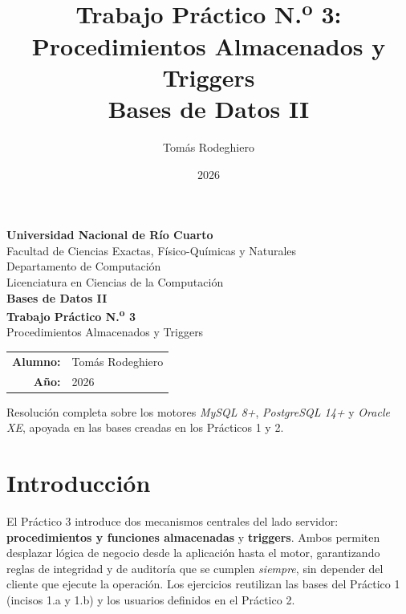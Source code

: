 \documentclass[11pt,a4paper]{article}
\title{Trabajo Práctico N.\textsuperscript{o} 3:
       Procedimientos Almacenados y Triggers\\[4pt]
       \large Bases de Datos II}
\author{Tomás Rodeghiero}
\date{2026}
\begin{document}
\begin{titlepage}
    \centering
    \vspace*{1.5cm}

    {\large \textbf{Universidad Nacional de Río Cuarto}}\\[6pt]
    {\normalsize Facultad de Ciencias Exactas, Físico-Químicas y Naturales}\\[4pt]
    {\normalsize Departamento de Computación}\\[4pt]
    {\normalsize Licenciatura en Ciencias de la Computación}\\[3cm]

    {\Large \textbf{Bases de Datos II}}\\[1.2cm]

    {\Large \textbf{Trabajo Práctico N.\textsuperscript{o} 3}}\\[6pt]
    {\large Procedimientos Almacenados y Triggers}\\[3cm]

    \begin{tabular}{rl}
        \textbf{Alumno:} & Tomás Rodeghiero \\[4pt]
        \textbf{Año:}    & 2026 \\
    \end{tabular}

    \vfill
    {\small Resolución completa sobre los motores
    \emph{MySQL 8+}, \emph{PostgreSQL 14+} y \emph{Oracle XE},
    apoyada en las bases creadas en los Prácticos 1 y 2.}
\end{titlepage}

\tableofcontents
\newpage

\section{Introducción}

El Práctico 3 introduce dos mecanismos centrales del lado servidor: \textbf{procedimientos y funciones almacenadas} y \textbf{triggers}. Ambos permiten desplazar lógica de negocio desde la aplicación hasta el motor, garantizando reglas de integridad y de auditoría que se cumplen \emph{siempre}, sin depender del cliente que ejecute la operación. Los ejercicios reutilizan las bases del Práctico 1 (incisos 1.a y 1.b) y los usuarios definidos en el Práctico 2.
\end{document}
